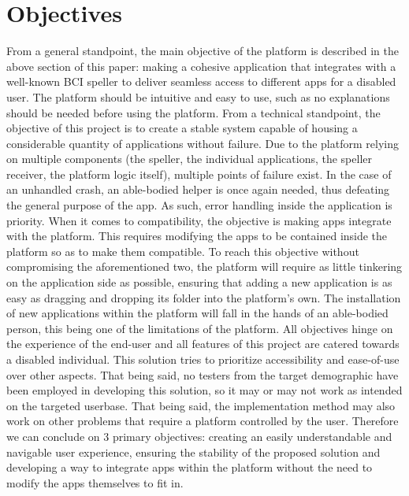 \section{Objectives}\label{sect:objectives}
From a general standpoint, the main objective of the platform is described in the above section of this paper: making a cohesive application that integrates with a well-known BCI speller to deliver seamless access to different apps for a disabled user. The platform should be intuitive and easy to use, such as no explanations should be needed before using the platform. 
\vspace{\baselineskip}\newline
From a technical standpoint, the objective of this project is to create a stable system capable of housing a considerable quantity of applications without failure. Due to the platform relying on multiple components (the speller, the individual applications, the speller receiver, the platform logic itself), multiple points of failure exist. In the case of an unhandled crash, an able-bodied helper is once again needed, thus defeating the general purpose of the app. As such, error handling inside the application is priority. 
\vspace{\baselineskip}\newline
When it comes to compatibility, the objective is making apps integrate with the platform. This requires modifying the apps to be contained inside the platform so as to make them compatible. To reach this objective without compromising the aforementioned two, the platform will require as little tinkering on the application side as possible, ensuring that adding a new application is as easy as dragging and dropping its folder into the platform's own. The installation of new applications within the platform will fall in the hands of an able-bodied person, this being one of the limitations of the platform. 
\vspace{\baselineskip}\newline
All objectives hinge on the experience of the end-user and all features of this project are catered towards a disabled individual. This solution tries to prioritize accessibility and ease-of-use over other aspects. That being said, no testers from the target demographic have been employed in developing this solution, so it may or may not work as intended on the targeted userbase. That being said, the implementation method may also work on other problems that require a platform controlled by the user.
\vspace{\baselineskip}\newline
Therefore we can conclude on 3 primary objectives: creating an easily understandable and navigable user experience, ensuring the stability of the proposed solution and developing a way to integrate apps within the platform without the need to modify the apps themselves to fit in.



